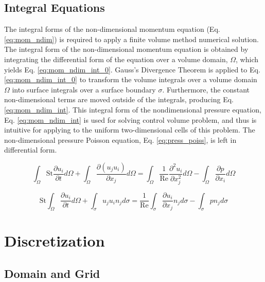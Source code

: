 \documentclass[10pt, letterpaper]{article}
\begin{document}
\subsection{Integral Equations}

The integral forms of the non-dimensional momentum equation (Eq. \ref{eq:mom_ndim}) is required to apply a finite volume method numerical solution. The integral form of the non-dimensional momentum equation is obtained by integrating the differential form of the equation over a volume domain, $\Omega$, which yields Eq. \ref{eq:mom_ndim_int_0}. Gauss's Divergence Theorem is applied to Eq. \ref{eq:mom_ndim_int_0} to transform the volume integrals over a volume domain $\Omega$ into surface integrals over a surface boundary $\sigma$. Furthermore, the constant non-dimensional terms are moved outside of the integrals, producing Eq. \ref{eq:mom_ndim_int}. This integral form of the nondimensional pressure equation, Eq. \ref{eq:mom_ndim_int} is used for solving control volume problem, and thus is intuitive for applying to the uniform two-dimensional cells of this problem. The non-dimensional pressure Poisson equation, Eq. \ref{eq:press_poiss}, is left in differential form. 

\begin{equation}
  \int_{\Omega}\text{St}\frac{\partial{u_{i}}}{\partial{t}}d\Omega + \int_{\Omega}\frac{\partial(u_{j}u_{i})}{\partial{x_{j}}}d\Omega = \int_{\Omega}\frac{1}{\text{Re}}\frac{\partial^{2}u_{i}}{\partial{x_{j}^{2}}}d\Omega - \int_{\Omega}\frac{\partial{p}}{\partial{x_{i}}}d\Omega
  \label{eq:mom_ndim_int_0}
\end{equation}

\begin{equation}
  \boxed{\text{St}\int_{\Omega}\frac{\partial{u_{i}}}{\partial{t}}d\Omega + \int_{\sigma}{u_{j}u_{i}n_{j}}d\sigma = \frac{1}{\text{Re}}\int_{\sigma}\frac{\partial{u_{i}}}{\partial{x_{j}}}n_{j}d\sigma - \int_{\sigma}{pn_{j}}d\sigma}
  \label{eq:mom_ndim_int}
\end{equation}

\section{Discretization}

\subsection{Domain and Grid}

\printbibliography{}
\end{document}
